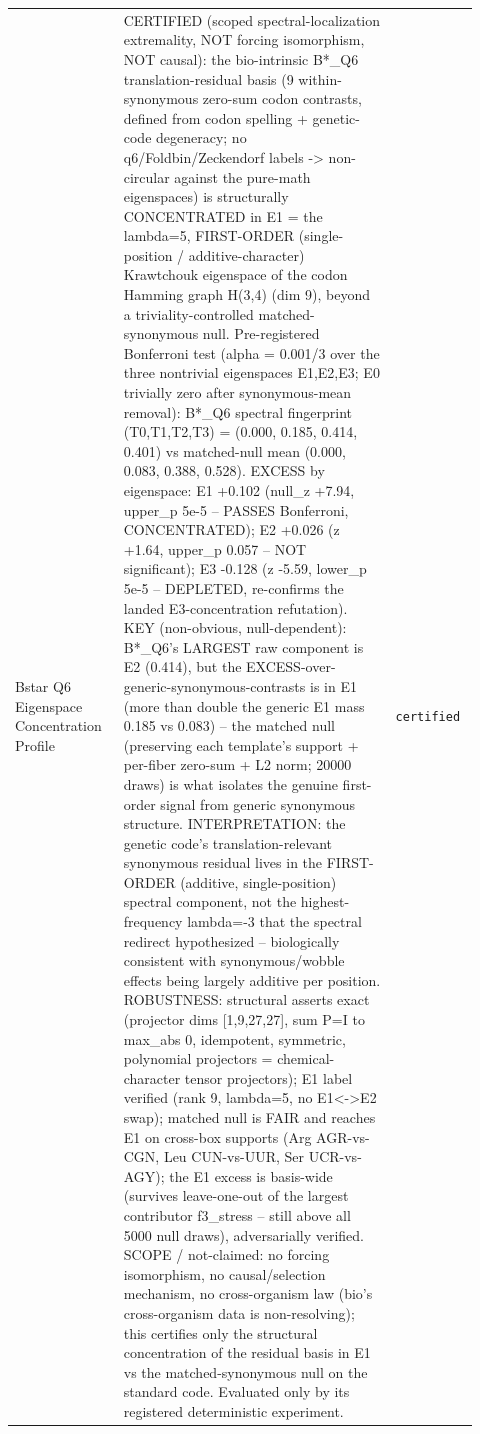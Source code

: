\begin{longtable}{>{\raggedright\arraybackslash}p{0.22\linewidth}>{\raggedright\arraybackslash}p{0.55\linewidth}>{\raggedright\arraybackslash}p{0.15\linewidth}}
Bstar Q6 Eigenspace Concentration Profile & CERTIFIED (scoped spectral-localization extremality, NOT forcing isomorphism, NOT causal): the bio-intrinsic B*\_Q6 translation-residual basis (9 within-synonymous zero-sum codon contrasts, defined from codon spelling + genetic-code degeneracy; no q6/Foldbin/Zeckendorf labels -> non-circular against the pure-math eigenspaces) is structurally CONCENTRATED in E1 = the lambda=5, FIRST-ORDER (single-position / additive-character) Krawtchouk eigenspace of the codon Hamming graph H(3,4) (dim 9), beyond a triviality-controlled matched-synonymous null. Pre-registered Bonferroni test (alpha = 0.001/3 over the three nontrivial eigenspaces E1,E2,E3; E0 trivially zero after synonymous-mean removal): B*\_Q6 spectral fingerprint (T0,T1,T2,T3) = (0.000, 0.185, 0.414, 0.401) vs matched-null mean (0.000, 0.083, 0.388, 0.528). EXCESS by eigenspace: E1 +0.102 (null\_z +7.94, upper\_p 5e-5 -- PASSES Bonferroni, CONCENTRATED); E2 +0.026 (z +1.64, upper\_p 0.057 -- NOT significant); E3 -0.128 (z -5.59, lower\_p 5e-5 -- DEPLETED, re-confirms the landed E3-concentration refutation). KEY (non-obvious, null-dependent): B*\_Q6's LARGEST raw component is E2 (0.414), but the EXCESS-over-generic-synonymous-contrasts is in E1 (more than double the generic E1 mass 0.185 vs 0.083) -- the matched null (preserving each template's support + per-fiber zero-sum + L2 norm; 20000 draws) is what isolates the genuine first-order signal from generic synonymous structure. INTERPRETATION: the genetic code's translation-relevant synonymous residual lives in the FIRST-ORDER (additive, single-position) spectral component, not the highest-frequency lambda=-3 that the spectral redirect hypothesized -- biologically consistent with synonymous/wobble effects being largely additive per position. ROBUSTNESS: structural asserts exact (projector dims [1,9,27,27], sum P=I to max\_abs 0, idempotent, symmetric, polynomial projectors = chemical-character tensor projectors); E1 label verified (rank 9, lambda=5, no E1<->E2 swap); matched null is FAIR and reaches E1 on cross-box supports (Arg AGR-vs-CGN, Leu CUN-vs-UUR, Ser UCR-vs-AGY); the E1 excess is basis-wide (survives leave-one-out of the largest contributor f3\_stress -- still above all 5000 null draws), adversarially verified. SCOPE / not-claimed: no forcing isomorphism, no causal/selection mechanism, no cross-organism law (bio's cross-organism data is non-resolving); this certifies only the structural concentration of the residual basis in E1 vs the matched-synonymous null on the standard code. Evaluated only by its registered deterministic experiment. & \texttt{certified} \\

\end{longtable}
